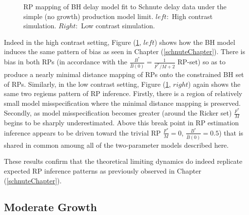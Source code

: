 \begin{figure}[h!]
\begin{minipage}[h!]{0.09\textwidth}
\end{minipage}
\caption{
RP mapping of BH delay model fit to Schnute delay data under the simple (no
growth) production model limit. $left:$ High contrast simulation.
$Right:$ Low contrast simulation.
}\label{prodLimit}
\end{figure}


Indeed in the high contrast setting, Figure (\ref{prodLimit}, $left$) shows
how the BH model induces the same pattern of bias as seen in Chapter
(\ref{schnuteChapter}). There is bias in both RPs (in accordance with the
$\frac{B^*}{\bar B(0)}=\frac{1}{F^*/M+2}$ RP-set) so as to produce a nearly
minimal distance mapping of RPs onto the constrained BH set of RPs.
Similarly, in the low contrast setting, Figure (\ref{prodLimit}, $right$) again
shows the same two regiems pattern of RP inference. Firstly, there is a region of
relatively small model misspecification where the minimal distance mapping
is preserved. Secondly, as model misspecification becomes greater (around the
Ricker set) $\frac{F^*}{M}$ begins to be sharply underestimated. Above this
break point in RP estimation inference appears to be driven toward the trivial RP
$\frac{F^*}{M}=0$, $\frac{B^*}{\bar B(0)}=0.5$) that is shared in common
amoung all of the two-parameter models described here.

%
These results confirm that the theoretical limiting dynamics do 
indeed replicate expected RP inference patterns as previously observed in 
Chapter (\ref{schnuteChapter}).

%
\subsection{Moderate Growth}

